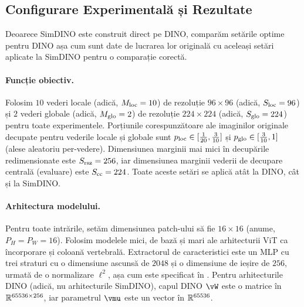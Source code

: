 \documentclass[../../book-main_ro.tex]{subfiles}
\begin{document}
\subsection{Configurare Experimentală și Rezultate} \label{sub:contrastive_learning_experiment_results}

Deoarece SimDINO este construit direct pe DINO, comparăm setările optime pentru DINO așa cum sunt date de lucrarea lor originală \citep{caron2021emerging} cu aceleași setări aplicate la SimDINO pentru o comparație corectă.

\paragraph{Funcție obiectiv.} Folosim \(10\) vederi locale (adică, \(M_{\mathrm{loc}} = 10\)) de rezoluție \(96 \times 96\) (adică, \(S_{\mathrm{loc}} = 96\)) și \(2\) vederi globale (adică, \(M_{\mathrm{glo}} = 2\)) de rezoluție \(224 \times 224\) (adică, \(S_{\mathrm{glo}} = 224\)) pentru toate experimentele. Porțiunile corespunzătoare ale imaginilor originale decupate pentru vederile locale și globale sunt \(p_{\mathrm{loc}} \in [\frac{1}{20}, \frac{3}{10}]\) și \(p_{\mathrm{glo}} \in [\frac{3}{10}, 1]\) (alese aleatoriu per-vedere). Dimensiunea marginii mai mici în decupările redimensionate este \(S_{\mathrm{rsz}} = 256\), iar dimensiunea marginii vederii de decupare centrală (evaluare) este \(S_{\mathrm{cc}} = 224\). Toate aceste setări se aplică atât la DINO, cât și la SimDINO.

\paragraph{Arhitectura modelului.} Pentru toate intrările, setăm dimensiunea patch-ului să fie \(16 \times 16\) (anume, \(P_{H} = P_{W} = 16\)). Folosim modelele mici, de bază și mari ale arhitecturii ViT \citep{dosovitskiy2020image} ca încorporare și coloană vertebrală. Extractorul de caracteristici este un MLP cu trei straturi cu o dimensiune ascunsă de \(2048\) și o dimensiune de ieșire de \(256\), urmată de o normalizare \(\ell^{2}\), așa cum este specificat în . Pentru arhitecturile DINO (adică, nu arhitecturile SimDINO), capul DINO \(\vW\) este o matrice în \(\mathbb{R}^{65536 \times 256}\), iar parametrul \(\vmu\) este un vector în \(\mathbb{R}^{65536}\).
\end{document}
